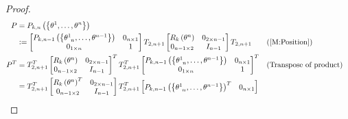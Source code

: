\documentclass[../main.tex]{subfiles}
\begin{document}
\begin{proof}
    \begin{align*}
        P&=P_{k,n}\left(\left\{\tensor{\theta}{^1},\dots,\tensor{\theta}{^n}\right\}\right) \\
        &\defeq
        \begin{bmatrix}
            P_{k,n-1}\left(\left\{\tensor{\theta}{^1_{n}},\dots,\tensor{\theta}{^{n-1}}\right\}\right) & 0_{n\times 1} \\
            0_{1\times n}                                                                              & 1             \\
        \end{bmatrix}
        T_{2,n+1}
        \begin{bmatrix}
            R_k\left(\tensor{\theta}{^n}\right) & 0_{{2}\times{n-1}} \\
            0_{{n-1}\times{2}}                  & {I}_{n-1}          \\
        \end{bmatrix}
        T_{2,n+1} && \text{(\cref{M:Position})} \\
        P^T
        &=
        T_{2,n+1}^T
        \begin{bmatrix}
            R_k\left(\tensor{\theta}{^n}\right) & 0_{{2}\times{n-1}} \\
            0_{{n-1}\times{2}}                  & {I}_{n-1}          \\
        \end{bmatrix}^T
        T_{2,n+1}^T
        \begin{bmatrix}
            P_{k,n-1}\left(\left\{\tensor{\theta}{^1_{n}},\dots,\tensor{\theta}{^{n-1}}\right\}\right) & 0_{n\times 1} \\
            0_{1\times n}                                                                              & 1             \\
        \end{bmatrix}^T && \text{(Transpose of product)} \\
        &=
        T_{2,n+1}^T
        \begin{bmatrix}
            R_k\left(\tensor{\theta}{^n}\right)^T & 0_{{2}\times{n-1}} \\
            0_{{n-1}\times{2}}                  & {I}_{n-1}          \\
        \end{bmatrix}
        T_{2,n+1}^T
        \begin{bmatrix}
            P_{k,n-1}\left(\left\{\tensor{\theta}{^1_{n}},\dots,\tensor{\theta}{^{n-1}}\right\}\right)^T & 0_{n\times 1} \\

\end{bmatrix}
\end{align*}
\end{proof}
\end{document}
